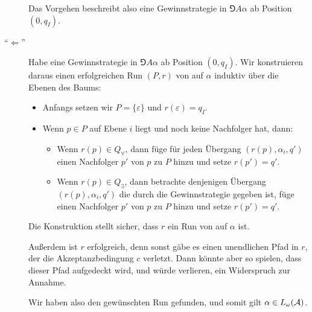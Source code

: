 \documentclass[fontsize=11pt, twoside=false, numbers=autoenddot]{scrbook}
\begin{document}
\begin{description}
    Das Vorgehen beschreibt also eine Gewinnstrategie \PlE
    in $\Game{A}{\alpha}$ ab Position $(0,q_I)$.
    \parI
  \item[{\boldmath "`$\Leftarrow$"'}]
    Habe \PlE eine Gewinnstrategie in $\Game{A}{\alpha}$ ab Position $(0,q_I)$.
    Wir konstruieren daraus einen erfolgreichen Run $(P,r)$ von \Amc auf $\alpha$
    induktiv über die Ebenen des Baums:
    \begin{itemize}
      \item
        Anfangs setzen wir $P = \{\varepsilon\}$ und $r(\varepsilon) = q_I$.
      \item
        Wenn $p \in P$ auf Ebene $i$ liegt und noch keine Nachfolger hat, dann:
        \begin{itemize}
          \item
            Wenn $r(p) \in Q_\forall$,
            dann füge für jeden Übergang $(r(p),\alpha_i,q')$
            einen Nachfolger $p'$ von $p$ zu $P$ hinzu und setze $r(p') = q'$.
          \item
            Wenn $r(p) \in Q_\exists$,
            dann betrachte denjenigen Übergang $(r(p),\alpha_i,q')$
            die durch die Gewinnstrategie gegeben ist,
            füge einen Nachfolger $p'$ von $p$ zu $P$ hinzu und setze $r(p') = q'$.
        \end{itemize}
    \end{itemize}
    Die Konstruktion stellt sicher, dass $r$ ein Run von \Amc auf $\alpha$ ist.
    
    Außerdem ist $r$ erfolgreich, denn sonst gäbe es einen unendlichen Pfad in $r$, der
    die Akzeptanzbedingung $c$ verletzt.
    Dann könnte aber \PlA so spielen, dass dieser Pfad aufgedeckt wird,
    und \PlE würde verlieren, ein Widerspruch zur Annahme.
    
    Wir haben also den gewünschten Run gefunden, und somit gilt $\alpha \in L_\omega(\mathcal{A})$.
    \qedhere
\end{description}
\end{document}

